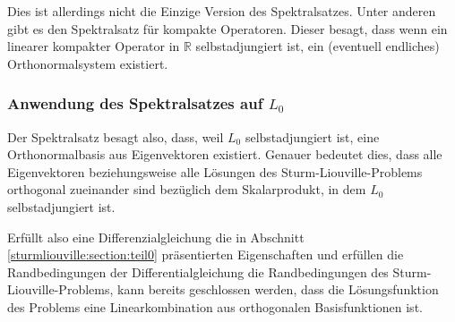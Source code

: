 Dies ist allerdings nicht die Einzige Version des Spektralsatzes.
Unter anderen gibt es den Spektralsatz für kompakte Operatoren.
Dieser besagt, dass wenn ein linearer kompakter Operator in
$\mathbb{R}$ selbstadjungiert ist, ein (eventuell endliches)
Orthonormalsystem existiert.

\subsubsection{Anwendung des Spektralsatzes auf $L_0$}

Der Spektralsatz besagt also, dass, weil $ L_0 $ selbstadjungiert ist, eine
Orthonormalbasis aus Eigenvektoren existiert.
Genauer bedeutet dies, dass alle Eigenvektoren beziehungsweise alle Lösungen
des Sturm-Liouville-Problems orthogonal zueinander sind bezüglich dem
Skalarprodukt, in dem $ L_0 $ selbstadjungiert ist.

Erfüllt also eine Differenzialgleichung die in Abschnitt
\ref{sturmliouville:section:teil0} präsentierten Eigenschaften und erfüllen
die Randbedingungen der Differentialgleichung die Randbedingungen
des Sturm-Liouville-Problems, kann bereits geschlossen werden, dass die
Lösungsfunktion des Problems eine Linearkombination aus orthogonalen
Basisfunktionen ist.
